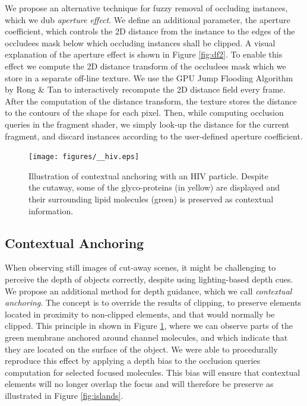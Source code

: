We propose an alternative technique for fuzzy removal of occluding instances, which we dub \emph{aperture effect}.
We define an additional parameter, the aperture coefficient, which controls the 2D distance from the instance to the edges of the occludees mask below which occluding instances shall be clipped.
A visual explanation of the aperture effect is shown in Figure \ref{fig:df2}.
To enable this effect we compute the 2D distance transform of the occludees mask which we store in a separate off-line texture.
We use the GPU Jump Flooding Algorithm by Rong \& Tan \cite{Rong06} to interactively recompute the 2D distance field every frame. 
After the computation of the distance transform, the texture stores the distance to the contours of the shape for each pixel.
Then, while computing occlusion queries in the fragment shader, we simply look-up the distance for the current fragment, and discard instances according to the user-defined aperture coefficient.



\begin{figure}[t]
\centering
\texttt{[image: figures/\_\_hiv.eps]}
\caption{\label{fig:hiv-islands} 
Illustration of contextual anchoring with an HIV particle. 
Despite the cutaway, some of the glyco-proteins (in yellow) are displayed and their surrounding lipid molecules (green) is preserved as contextual information.}
\vspace{-2mm}
\end{figure}

\subsection{Contextual Anchoring}
\label{ssec:anchoring}

When observing still images of cut-away scenes, it might be challenging to perceive the depth of objects correctly, despite using lighting-based depth cues.
We propose an additional method for depth guidance, which we call \emph{contextual anchoring}.
The concept is to override the results of clipping, to preserve elements located in proximity to non-clipped elements, and that would normally be clipped.
This principle in shown in Figure \ref{fig:hiv-islands}, where we can observe parts of the green membrane anchored around channel molecules, and which indicate that they are located on the surface of the object.
We were able to procedurally reproduce this effect by applying a depth bias to the occlusion queries computation for selected focused molecules.
This bias will ensure that contextual elements will no longer overlap the focus and will therefore be preserve as illustrated in Figure \ref{fig:islands}.



